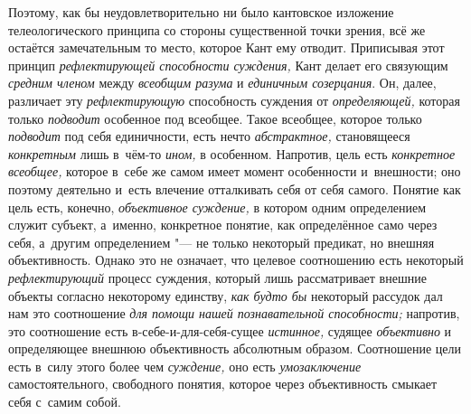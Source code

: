 Поэтому, как бы неудовлетворительно ни было кантовское
изложение телеологического принципа со стороны существенной точки зрения,
всё же остаётся замечательным то место, которое Кант ему отводит.
Приписывая этот принцип {\em рефлектирующей способности суждения,}
Кант делает его связующим {\em средним членом} между {\em всеобщим разума}
и {\em единичным созерцания}. Он, далее, различает эту
{\em рефлектирующую} способность суждения от {\em определяющей,}
которая только {\em подводит} особенное под всеобщее. Такое всеобщее,
которое только {\em подводит} под себя единичности, есть нечто
{\em абстрактное,} становящееся {\em конкретным} лишь в~чём-то {\em ином,}
в особенном. Напротив, цель есть {\em конкретное всеобщее,}
которое в~себе же самом имеет момент особенности и~внешности;
оно поэтому деятельно и~есть влечение отталкивать себя от себя самого.
Понятие как цель есть, конечно, {\em объективное суждение,}
в котором одним определением служит субъект, а~именно,
конкретное понятие, как определённое само через себя, а~другим
определением "--- не только некоторый предикат, но внешняя
объективность. Однако это не означает, что целевое соотношению есть
некоторый {\em рефлектирующий} процесс суждения, который лишь рассматривает
внешние объекты согласно некоторому единству, {\em как будто бы} некоторый
рассудок дал нам это соотношение {\em для помощи нашей познавательной
способности;} напротив, это соотношение есть
в-себе-и-для-себя-сущее {\em истинное,} судящее {\em объективно}
и определяющее внешнюю объективность абсолютным образом.
Соотношение цели есть в~силу этого более чем {\em суждение,} оно есть
{\em умозаключение} самостоятельного, свободного понятия, которое через
объективность смыкает себя с~самим собой.


